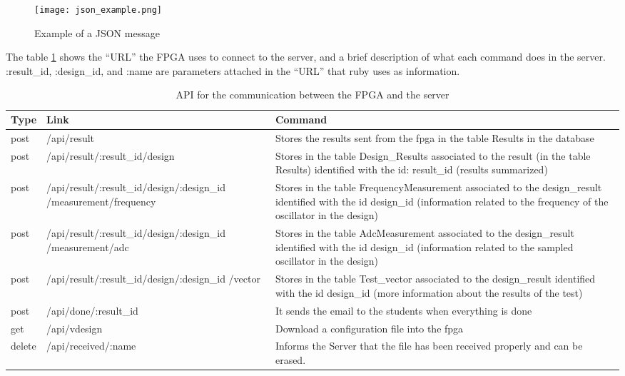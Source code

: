 \begin{figure}[htb]
\centering
\texttt{[image: json\_example.png]}
\caption{Example of a JSON message}
\label{fig:Json_message}
\end{figure}

The table \ref{tab:api_server_fpga} shows the ``URL'' the FPGA uses to connect to the server, and a brief description of what each command does in the server. :result\_id, :design\_id,
and :name are parameters attached in the ``URL'' that ruby uses as information. 

\begin{table}[h!]
\centering
    \begin{tabular}{ | l | p{7cm} | p{5cm}|}
    \hline
    Type & Link & Command   \\ \hline
    post & /api/result & Stores the results sent from the fpga in the table Results in the database\\ \hline
    post & /api/result/:result\_id/design & Stores in the table Design\_Results associated to the result (in the table Results) identified with the id: result\_id (results summarized)\\ \hline
    post & /api/result/:result\_id/design/:design\_id	/measurement/frequency & Stores in the table FrequencyMeasurement associated to the design\_result identified with the id design\_id (information related to the frequency of the oscillator in the design)\\ \hline
    post & /api/result/:result\_id/design/:design\_id	/measurement/adc & Stores in the table AdcMeasurement associated to the design\_result identified with the id design\_id (information related to the sampled oscillator in the design)  \\ \hline
    post & /api/result/:result\_id/design/:design\_id	/vector & Stores in the table Test\_vector associated to the design\_result identified with the id design\_id (more information about the results of the test)\\ \hline
    post & /api/done/:result\_id & It sends the email to the students when everything is done\\ \hline
    get & /api/vdesign & Download a configuration file into the fpga\\ \hline
    delete & /api/received/:name & Informs the Server that the file has been received properly and can be erased.\\ \hline
    \end{tabular}
    \caption{API for the communication between the FPGA and the server}
    \label{tab:api_server_fpga}
\end{table}

